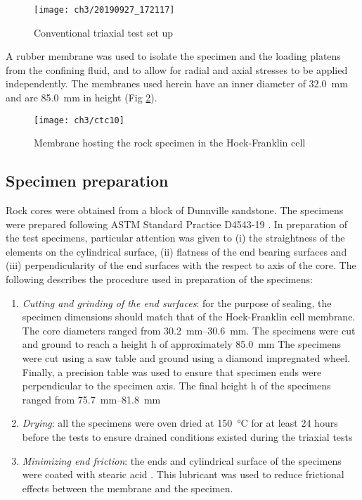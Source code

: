 \begin{figure}[tb]
    \centering
    \texttt{[image: ch3/20190927\_172117]}
    \caption{Conventional triaxial test set up}
    \label{fig3:5}
\end{figure} 

A rubber membrane was used to isolate the specimen and the loading platens from the confining fluid, and to allow for radial and axial stresses to be applied independently. The membranes used herein have an inner diameter of \SI{32.0}{mm} and are \SI{85.0}{mm} in height (Fig \ref{fig3:6}).

\begin{figure}[tb]
    \centering
    \texttt{[image: ch3/ctc10]}
    \caption{Membrane hosting the rock specimen in the Hoek-Franklin cell}
    \label{fig3:6}
\end{figure} 

\subsection{Specimen preparation} \label{ch3:specimen-prep}

Rock cores were obtained from a block of Dunnville sandstone. The specimens were prepared following ASTM Standard Practice D4543-19 \cite{ASTM2019}. In preparation of the test specimens, particular attention was given to (i) the straightness of the elements on the cylindrical surface, (ii) flatness of the end bearing surfaces and (iii) perpendicularity of the end surfaces with the respect to axis of the core. The following describes the procedure used in preparation of the specimens:

\begin{enumerate}
    \item \emph{Cutting and grinding of the end surfaces}: for the purpose of sealing, the specimen dimensions should match that of the Hoek-Franklin cell membrane. The core diameters ranged from \SIrange{30.2}{30.6}{mm}. The specimens were cut and ground to reach a height h of approximately  \SI{85.0}{mm} The specimens were cut using a saw table and ground using a diamond impregnated wheel. Finally, a precision table was used to ensure that specimen ends were perpendicular to the specimen axis. The final height h of the specimens ranged from \SIrange{75.7}{81.8}{mm} 
    \item \emph{Drying}: all the specimens were oven dried at \SI{150}{\celsius} for at least 24 hours before the tests to ensure drained conditions existed during the triaxial tests
    \item \emph{Minimizing end friction}: the ends and cylindrical surface of the specimens were coated with stearic acid \cite{ASTM2019}. This lubricant was used to reduce frictional effects between the membrane and the specimen.
\end{enumerate}

